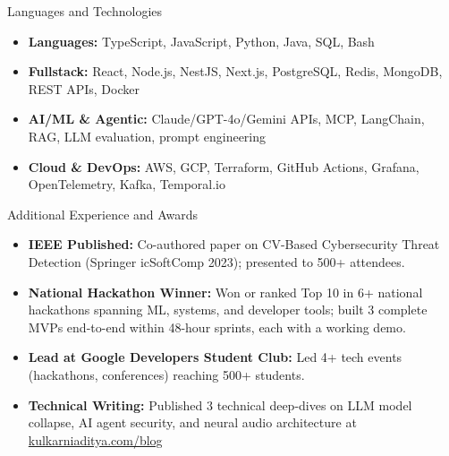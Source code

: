 \documentclass[]{mcdowellcv}
\begin{document}
\begin{cvsection}{Languages and Technologies}
  \begin{cvsubsection}{}{}{}
    \begin{itemize}
      \item \textbf{Languages:} TypeScript, JavaScript, Python, Java, SQL, Bash
      \item \textbf{Fullstack:} React, Node.js, NestJS, Next.js, PostgreSQL, Redis, MongoDB, REST APIs, Docker
      \item \textbf{AI/ML \& Agentic:} Claude/GPT-4o/Gemini APIs, MCP, LangChain, RAG, LLM evaluation, prompt engineering
      \item \textbf{Cloud \& DevOps:} AWS, GCP, Terraform, GitHub Actions, Grafana, OpenTelemetry, Kafka, Temporal.io
    \end{itemize}
  \end{cvsubsection}
\end{cvsection}

\begin{cvsection}{Additional Experience and Awards}
  \begin{cvsubsection}{}{}{}
    \begin{itemize}
      \item \textbf{IEEE Published:} Co-authored paper on CV-Based Cybersecurity Threat Detection (Springer icSoftComp 2023); presented to 500+ attendees.
      \item \textbf{National Hackathon Winner:} Won or ranked Top 10 in 6+ national hackathons spanning ML, systems, and developer tools; built 3 complete MVPs end-to-end within 48-hour sprints, each with a working demo.
      \item \textbf{Lead at Google Developers Student Club:} Led 4+ tech events (hackathons, conferences) reaching 500+ students.
      \item \textbf{Technical Writing:} Published 3 technical deep-dives on LLM model collapse, AI agent security, and neural audio architecture at \href{https://www.kulkarniaditya.com/blog}{kulkarniaditya.com/blog}
    \end{itemize}
  \end{cvsubsection}
\end{cvsection}
\end{document}
